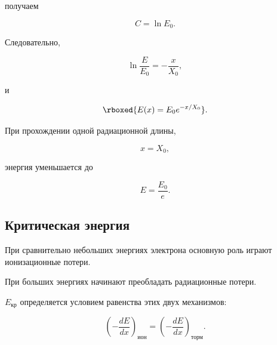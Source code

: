 \documentclass[../final.tex]{subfiles}
\begin{document}
получаем

\begin{equation*}
    C=\ln E_0.
\end{equation*}

Следовательно,

\begin{equation*}
    \ln\frac{E}{E_0}
    =
    -
    \frac{x}{X_0},
\end{equation*}

и

\begin{equation*}
    \rboxed{
        E(x)
        =
        E_0
        e^{-x/X_0}
    }.
\end{equation*}

При прохождении одной радиационной длины,

\begin{equation*}
    x=X_0,
\end{equation*}

энергия уменьшается до

\begin{equation*}
    E
    =
    \frac{E_0}{e}.
\end{equation*}



\subsection*{Критическая энергия}

При сравнительно небольших энергиях электрона
основную роль играют ионизационные потери.

При больших энергиях начинают преобладать
радиационные потери.

 $E_{\text{кр}}$
определяется условием равенства этих двух механизмов:

\begin{equation*}
    \left(
        -
        \frac{dE}{dx}
    \right)_{\text{ион}}
    =
    \left(
        -
        \frac{dE}{dx}
    \right)_{\text{торм}}.
\end{equation*}


\end{document}
